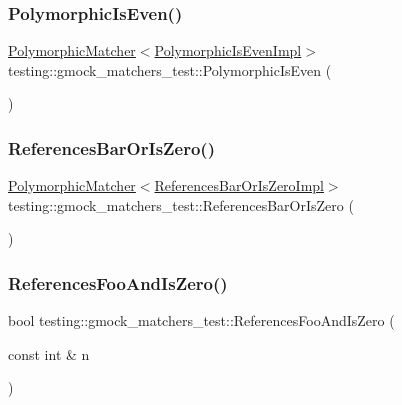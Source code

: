 \subsubsection{\texorpdfstring{Polymorphic\+Is\+Even()}{PolymorphicIsEven()}}
{\footnotesize\ttfamily \hyperlink{classtesting_1_1_polymorphic_matcher}{Polymorphic\+Matcher}$<$\hyperlink{classtesting_1_1gmock__matchers__test_1_1_polymorphic_is_even_impl}{Polymorphic\+Is\+Even\+Impl}$>$ testing\+::gmock\+\_\+matchers\+\_\+test\+::\+Polymorphic\+Is\+Even (\begin{DoxyParamCaption}{ }\end{DoxyParamCaption})}

\mbox{\label{namespacetesting_1_1gmock__matchers__test_ac07376a5dff45a905b7eb96e621ce3aa}} 
\subsubsection{\texorpdfstring{References\+Bar\+Or\+Is\+Zero()}{ReferencesBarOrIsZero()}}
{\footnotesize\ttfamily \hyperlink{classtesting_1_1_polymorphic_matcher}{Polymorphic\+Matcher}$<$\hyperlink{classtesting_1_1gmock__matchers__test_1_1_references_bar_or_is_zero_impl}{References\+Bar\+Or\+Is\+Zero\+Impl}$>$ testing\+::gmock\+\_\+matchers\+\_\+test\+::\+References\+Bar\+Or\+Is\+Zero (\begin{DoxyParamCaption}{ }\end{DoxyParamCaption})}

\mbox{\label{namespacetesting_1_1gmock__matchers__test_abdce9daf2e3d3721d68f76680129f03b}} 
\subsubsection{\texorpdfstring{References\+Foo\+And\+Is\+Zero()}{ReferencesFooAndIsZero()}}
{\footnotesize\ttfamily bool testing\+::gmock\+\_\+matchers\+\_\+test\+::\+References\+Foo\+And\+Is\+Zero (\begin{DoxyParamCaption}\item[{const int \&}]{n }\end{DoxyParamCaption})}

